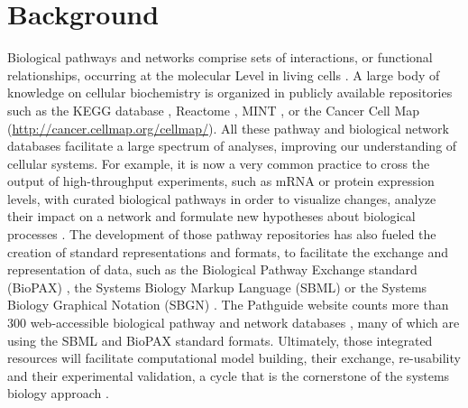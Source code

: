 \documentclass[10pt]{bmc_article}
\newenvironment{bmcformat}{\baselineskip20pt\sloppy\setboolean{publ}{false}}{\baselineskip20pt\sloppy}
\begin{document}
\begin{bmcformat}
\section*{Background}

Biological pathways and networks comprise sets of interactions, or functional
relationships, occurring at the molecular Level in living cells
\cite{adriaens2008public, cary2005pathway}. 
A large body of knowledge on cellular biochemistry is organized in publicly available
repositories such as the KEGG database \cite{ogata1999kegg}, Reactome
\cite{joshi2005reactome}, MINT \cite{zanzoni2002mint}, or the Cancer Cell Map
(\url{http://cancer.cellmap.org/cellmap/}). All these pathway and biological
network databases facilitate a large spectrum of analyses, improving our
understanding of cellular systems. For example, it is now a very common
practice to cross the output of high-throughput experiments, such as mRNA or
protein expression levels, with curated biological pathways in
order to visualize changes, analyze their impact on a network and
formulate new hypotheses about
biological processes \cite{saraiya2005visualizing,
gehlenborg2010visualization}. The development of those pathway repositories has
also fueled the creation of standard representations and formats, to facilitate
the exchange and representation of data, such as the Biological Pathway
Exchange standard (BioPAX) \cite{demir2010biopax}, the Systems Biology Markup
Language (SBML) \cite{hucka2003systems} or the Systems Biology Graphical
Notation (SBGN) \cite{le2009systems}. The Pathguide website counts
more than 300 web-accessible biological pathway and network databases
\cite{bader2006pathguide}, many of which are using the SBML and BioPAX standard
formats. Ultimately, those integrated resources will facilitate computational
model building, their exchange, re-usability and their experimental validation, a cycle that is the
cornerstone of the systems biology approach \cite{karlebach2008modelling,
kitano2002systems, ideker2001new}.


\end{bmcformat}
\end{document}
